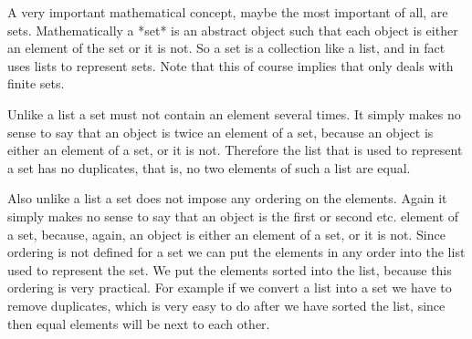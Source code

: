 %

A  very important mathematical concept,  maybe the most important of all,
are sets.  Mathematically  a *set* is  an abstract object such that  each
object  is either an element  of the  set or it  is not.   So  a set is a
collection like  a list, and in fact {\GAP} uses lists to represent sets.
Note that this of course implies that {\GAP} only deals with finite sets.

Unlike a list a set must not contain an element several times.  It simply
makes no sense to say   that an object is   twice  an element of a   set,
because an object is either an element of a set, or it is not.  Therefore
the list that is used  to represent a set has  no duplicates, that is, no
two elements of such a list are equal.

Also unlike a  list a set does not  impose any ordering  on the elements.
Again it  simply makes no  sense to say  that an object  is  the first or
second etc.  element of  a set, because,  again, an  object is  either an
element of a set, or it is not.  Since ordering is  not defined for a set
we can put the elements in any order into the  list used to represent the
set.  We put the elements sorted into the  list, because this ordering is
very practical.  For example if we convert a  list into a  set we have to
remove  duplicates, which is  very  easy to do  after  we have sorted the
list, since then equal elements will be next to each other.

